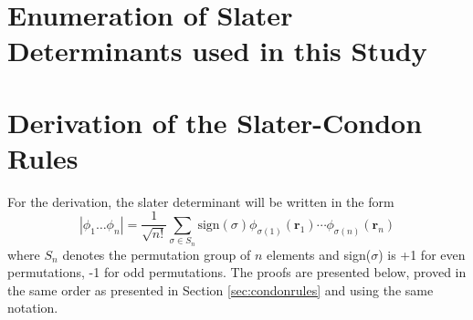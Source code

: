 \documentclass[final,3p,times,twocolumn]{elsarticle}
\begin{document}
\appendix
\section{Enumeration of Slater Determinants used in this Study} \label{app:det}

\section{Derivation of the Slater-Condon Rules}
\label{app:slatercondon}
For the derivation, the slater determinant will be written in the form
\begin{equation}
|\phi_1 \ldots \phi_n| = \dfrac{1}{\sqrt{n!}}\sum_{\sigma\in S_n} \text{sign}(\sigma) \phi_{\sigma(1)}(\mathbf{r}_1) \cdots \phi_{\sigma(n)}(\mathbf{r}_n)
\end{equation}
where $S_n$ denotes the permutation group of $n$ elements and sign($\sigma$) is +1 for even permutations, -1 for odd permutations. The proofs are presented below, proved in the same order as presented in Section \ref{sec:condonrules} and using the same notation.
\end{document}
